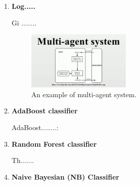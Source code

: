 \documentclass[journal]{IEEEtran}
\begin{document}


\begin{enumerate}
\item \textbf{Log.....}

Gi \cite{temp1}........

\begin{figure}[!h]
\begin{center}
\includegraphics[width=2in]{one.jpg}
\caption{An example of multi-agent system. \cite{temp1}}
\end{center}
\label{fig:mypicture1}
\end{figure}


\item \textbf{AdaBoost classifier}

AdaBoost........:





\item \textbf{Random Forest classifier}

Th.......


\item \textbf{Naive Bayesian (NB) Classifier}


\end{enumerate}

\end{document}
